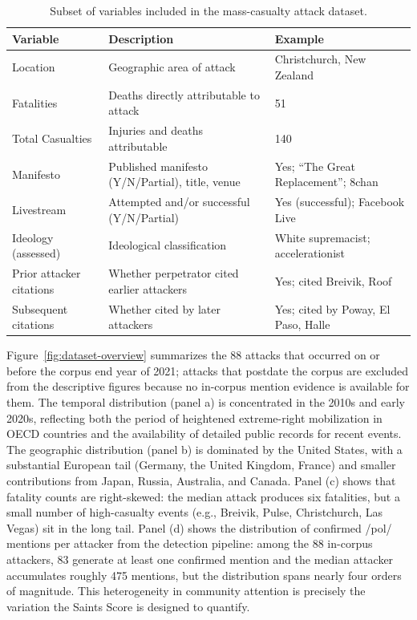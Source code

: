 \documentclass[12pt]{article}
\begin{document}
\begin{table}[htbp]
    \centering
    \begin{tabular}{p{4.5cm}p{5.5cm}p{5cm}}
    \toprule
        \textbf{Variable} & \textbf{Description} & \textbf{Example}\\
    \midrule
        Location & Geographic area of attack & Christchurch, New Zealand\\[0.3em]
        Fatalities & Deaths directly attributable to attack & 51\\[0.3em]
        Total Casualties & Injuries and deaths attributable & 140\\[0.3em]
        Manifesto & Published manifesto (Y/N/Partial), title, venue & Yes; ``The Great Replacement''; 8chan \\[0.3em]
        Livestream & Attempted and/or successful (Y/N/Partial) & Yes (successful); Facebook Live\\[0.3em]
        Ideology (assessed) & Ideological classification & White supremacist; accelerationist\\[0.3em]
        Prior attacker citations & Whether perpetrator cited earlier attackers & Yes; cited Breivik, Roof\\[0.3em]
        Subsequent citations & Whether cited by later attackers & Yes; cited by Poway, El Paso, Halle\\
    \bottomrule
    \end{tabular}
    \caption{Subset of variables included in the mass-casualty attack dataset.}
    \label{tab:database}
\end{table}

Figure~\ref{fig:dataset-overview} summarizes the 88 attacks that occurred on or before the corpus end year of 2021; attacks that postdate the corpus are excluded from the descriptive figures because no in-corpus mention evidence is available for them. The temporal distribution (panel a) is concentrated in the 2010s and early 2020s, reflecting both the period of heightened extreme-right mobilization in OECD countries and the availability of detailed public records for recent events. The geographic distribution (panel b) is dominated by the United States, with a substantial European tail (Germany, the United Kingdom, France) and smaller contributions from Japan, Russia, Australia, and Canada. Panel (c) shows that fatality counts are right-skewed: the median attack produces six fatalities, but a small number of high-casualty events (e.g., Breivik, Pulse, Christchurch, Las Vegas) sit in the long tail. Panel (d) shows the distribution of confirmed /pol/ mentions per attacker from the detection pipeline: among the 88 in-corpus attackers, 83 generate at least one confirmed mention and the median attacker accumulates roughly 475 mentions, but the distribution spans nearly four orders of magnitude. This heterogeneity in community attention is precisely the variation the Saints Score is designed to quantify.
\end{document}
